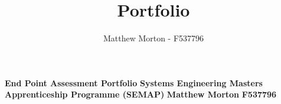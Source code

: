 \documentclass[11pt]{article}
\title{Portfolio}
\author{Matthew Morton - F537796}
\begin{document}
\begin{center}
    \textbf{End Point Assessment Portfolio}
    \textbf{Systems Engineering Masters Apprenticeship Programme (SEMAP)}
    \textbf{Matthew Morton}
    \textbf{F537796}
\end{center}

\linespread{1.15}

\hrulefill

\tableofcontents

\hrulefill

\clearpage

\printbibliography[heading=bibintoc, title=References]{}
\end{document}
